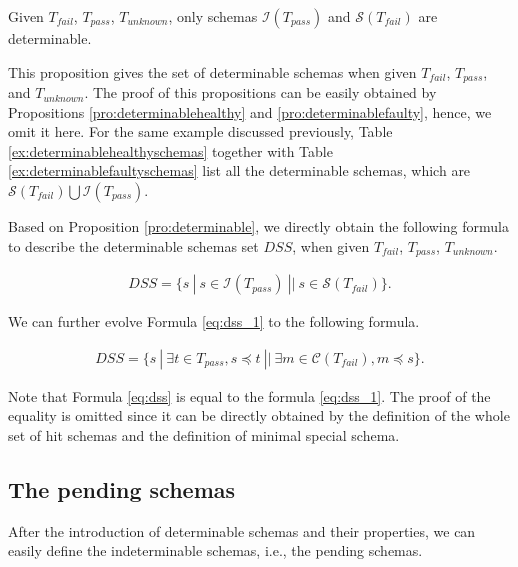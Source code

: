 \begin{proposition}\label{pro:determinable}
Given  $T_{fail}$, $T_{pass}$, $T_{unknown}$, only schemas $\mathcal{I}(T_{pass})$ and  $\mathcal{S}(T_{fail})$  are determinable.
\end{proposition}

This proposition gives the set of determinable schemas when given $T_{fail}$, $T_{pass}$, and $T_{unknown}$. The proof of this propositions can be easily obtained by Propositions \ref{pro:determinablehealthy} and \ref{pro:determinablefaulty}, hence, we omit it here. For the same example discussed previously, Table \ref{ex:determinablehealthyschemas} together with Table \ref{ex:determinablefaultyschemas} list all the determinable schemas, which are $\mathcal{S}(T_{fail}) \bigcup \mathcal{I}(T_{pass})$.

Based on Proposition \ref{pro:determinable}, we directly obtain the following formula to describe the determinable schemas set $DSS$, when given $T_{fail}$, $T_{pass}$, $T_{unknown}$.

\begin{equation}
\begin{aligned}\label{eq:dss_1}
DSS=\{ s\ |\ s \in  \mathcal{I}(T_{pass}) \ || \  s \in \mathcal{S}(T_{fail}) \} .
\end{aligned}
\end{equation}

We can further evolve Formula \ref{eq:dss_1} to the following formula.

\begin{equation}
\begin{aligned}\label{eq:dss}
DSS=\{ s\ |\ \exists t \in T_{pass},  s \preceq t  \ || \  \exists m \in \mathcal{C}(T_{fail}), m \preceq s \} .
\end{aligned}
\end{equation}

Note that Formula \ref{eq:dss} is equal to the formula \ref{eq:dss_1}. The proof of the equality is omitted since it can be directly obtained by the definition of the whole set of hit schemas and the definition of minimal special schema.


\subsection{The pending schemas}\label{sec:pending:pending}

After the introduction of determinable schemas and their properties, we can easily define the indeterminable schemas, i.e., the pending schemas.

